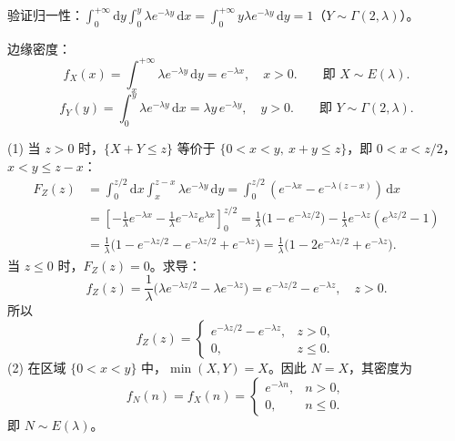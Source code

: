 ﻿\documentclass[lang=cn,11pt]{elegantbook}
\begin{document}
\begin{solution}
验证归一性：$\displaystyle\int_0^{+\infty}\mathrm{d}y\int_0^y \lambda e^{-\lambda y}\,\mathrm{d}x = \int_0^{+\infty}y\lambda e^{-\lambda y}\,\mathrm{d}y = 1$（$Y \sim \Gamma(2,\lambda)$）。

边缘密度：
\[
f_X(x) = \int_x^{+\infty}\lambda e^{-\lambda y}\,\mathrm{d}y = e^{-\lambda x}, \quad x > 0. \qquad \text{即 } X \sim E(\lambda).
\]
\[
f_Y(y) = \int_0^y \lambda e^{-\lambda y}\,\mathrm{d}x = \lambda y\,e^{-\lambda y}, \quad y > 0. \qquad \text{即 } Y \sim \Gamma(2,\lambda).
\]

(1) 当 $z > 0$ 时，$\{X+Y \leqslant z\}$ 等价于 $\{0 < x < y,\ x+y \leqslant z\}$，即 $0 < x < z/2$，$x < y \leqslant z-x$：
\begin{align*}
F_Z(z) &= \int_0^{z/2}\mathrm{d}x\int_x^{z-x}\lambda e^{-\lambda y}\,\mathrm{d}y = \int_0^{z/2}(e^{-\lambda x} - e^{-\lambda(z-x)})\,\mathrm{d}x\\
&= \left[-\frac{1}{\lambda}e^{-\lambda x} - \frac{1}{\lambda}e^{-\lambda z}e^{\lambda x}\right]_0^{z/2} = \frac{1}{\lambda}\bigl(1 - e^{-\lambda z/2}\bigr) - \frac{1}{\lambda}e^{-\lambda z}(e^{\lambda z/2} - 1)\\
&= \frac{1}{\lambda}\bigl(1 - e^{-\lambda z/2} - e^{-\lambda z/2} + e^{-\lambda z}\bigr) = \frac{1}{\lambda}\bigl(1 - 2e^{-\lambda z/2} + e^{-\lambda z}\bigr).
\end{align*}
当 $z \leqslant 0$ 时，$F_Z(z) = 0$。求导：
\[
f_Z(z) = \frac{1}{\lambda}\bigl(\lambda e^{-\lambda z/2} - \lambda e^{-\lambda z}\bigr) = e^{-\lambda z/2} - e^{-\lambda z}, \quad z > 0.
\]
所以
\[
f_Z(z) = \begin{cases} e^{-\lambda z/2} - e^{-\lambda z}, & z > 0, \\ 0, & z \leqslant 0. \end{cases}
\]
(2) 在区域 $\{0 < x < y\}$ 中，$\min(X,Y) = X$。因此 $N = X$，其密度为
\[
f_N(n) = f_X(n) = \begin{cases} e^{-\lambda n}, & n > 0, \\ 0, & n \leqslant 0. \end{cases}
\]
即 $N \sim E(\lambda)$。
\end{solution}
\end{document}
